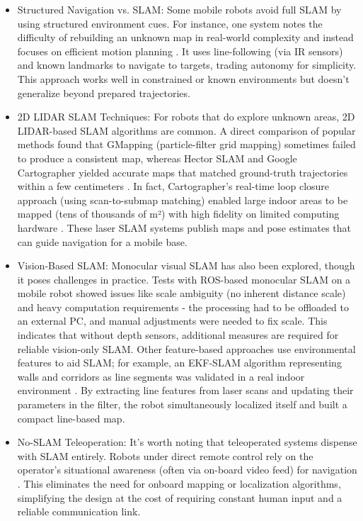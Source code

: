 \documentclass{article}
\begin{document}
\begin{itemize}
  
  \item Structured Navigation vs. SLAM: Some mobile robots avoid full SLAM by using structured environment cues. For instance, one system notes the difficulty of rebuilding an unknown map in real-world complexity and instead focuses on efficient motion planning \cite{7475009}. It uses line-following (via IR sensors) and known landmarks to navigate to targets, trading autonomy for simplicity. This approach works well in constrained or known environments but doesn't generalize beyond prepared trajectories.
  \item 2D LIDAR SLAM Techniques: For robots that do explore unknown areas, 2D LIDAR-based SLAM algorithms are common. A direct comparison of popular methods found that GMapping (particle-filter grid mapping) sometimes failed to produce a consistent map, whereas Hector SLAM and Google Cartographer yielded accurate maps that matched ground-truth trajectories within a few centimeters \cite{8710464}. In fact, Cartographer's real-time loop closure approach (using scan-to-submap matching) enabled large indoor areas to be mapped (tens of thousands of m²) with high fidelity on limited computing hardware \cite{7487258}. These laser SLAM systems publish maps and pose estimates that can guide navigation for a mobile base.
  \item Vision-Based SLAM: Monocular visual SLAM has also been explored, though it poses challenges in practice. Tests with ROS-based monocular SLAM on a mobile robot showed issues like scale ambiguity (no inherent distance scale) and heavy computation requirements - the processing had to be offloaded to an external PC, and manual adjustments were needed to fix scale. This indicates that without depth sensors, additional measures are required for reliable vision-only SLAM. Other feature-based approaches use environmental features to aid SLAM; for example, an EKF-SLAM algorithm representing walls and corridors as line segments was validated in a real indoor environment \cite{1582461}. By extracting line features from laser scans and updating their parameters in the filter, the robot simultaneously localized itself and built a compact line-based map.
  \item No-SLAM Teleoperation: It's worth noting that teleoperated systems dispense with SLAM entirely. Robots under direct remote control rely on the operator's situational awareness (often via on-board video feed) for navigation \cite{6805994}. This eliminates the need for onboard mapping or localization algorithms, simplifying the design at the cost of requiring constant human input and a reliable communication link.

\end{itemize}
\end{document}
